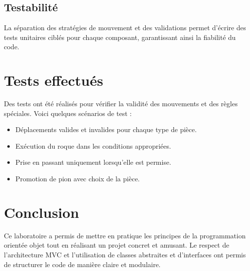 \documentclass[12pt]{report}
\begin{document}
    \subsection*{Testabilité}
    La séparation des stratégies de mouvement et des validations permet d'écrire des tests unitaires ciblés pour chaque composant, garantissant ainsi la fiabilité du code.


    \section*{Tests effectués}
    Des tests ont été réalisés pour vérifier la validité des mouvements et des règles spéciales. Voici quelques scénarios de test :
    \begin{itemize}
        \item Déplacements valides et invalides pour chaque type de pièce.
        \item Exécution du roque dans les conditions appropriées.
        \item Prise en passant uniquement lorsqu'elle est permise.
        \item Promotion de pion avec choix de la pièce.
    \end{itemize}



    \section*{Conclusion}
    Ce laboratoire a permis de mettre en pratique les principes de la programmation orientée objet tout en réalisant un projet concret et amusant. Le respect de l'architecture MVC et l'utilisation de classes abstraites et d'interfaces ont permis de structurer le code de manière claire et modulaire.
\end{document}
